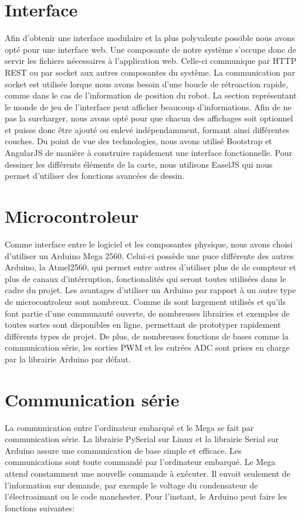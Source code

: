 \section{Interface}
Afin d'obtenir une interface modulaire et la plus polyvalente possible nous avons opté pour une interface web.
Une composante de notre système s'occupe donc de servir les fichiers nécessaires à l'application web.
Celle-ci communique par HTTP REST ou par socket aux autres composantes du système.
La communication par socket est utilisée lorque nous avons besoin d'une boucle de rétroaction rapide,
comme dans le cas de l'information de position du robot.
La section représentant le monde de jeu de l'interface peut afficher beaucoup d'informations.
Afin de ne pas la surcharger, nous avons opté pour que chacun des affichages soit optionnel et puisse donc
être ajouté ou enlevé indépendamment, formant ainsi différentes couches.
Du point de vue des technologies, nous avons utilisé Bootstrap et AngularJS de manière à construire rapidement une interface fonctionnelle.
Pour dessiner les différents éléments de la carte, nous utilisons EaselJS qui nous permet d'utiliser des fonctions avancées de dessin.


\section{Microcontroleur}

Comme interface entre le logiciel et les composantes physique, nous avons choisi d’utiliser un Arduino Mega 2560. Celui-ci possède une puce différente des autres Arduino, la Atmel2560, qui permet entre autres d’utiliser plus de de compteur et plus de canaux d’intérruption, fonctionalités qui seront toutes utilisées dans le cadre du projet. Les avantages d’utiliser un Arduino par rapport à un autre type de microcontroleur sont nombreux. Comme ils sont largement utilisés et qu’ils font partie d’une communauté ouverte, de nombreuses librairies et exemples de toutes sortes sont disponibles en ligne, permettant de prototyper rapidement différents types de projet. De plus, de nombreuses fonctions de bases comme la communication série, les sorties PWM et les entrées ADC sont prises en charge par la librairie Arduino par défaut.

\section{Communication série}

La communication entre l’ordinateur embarqué et le Mega se fait par communication série. La librairie PySerial sur Linux et la librairie Serial sur Arduino assure une communication de base simple et efficace. Les communications sont toute commandé par l’ordinateur embarqué. Le Mega attend constamment une nouvelle commande à exécuter. Il envoit seulement de l’information sur demande, par exemple le voltage du condensateur de l’électroaimant ou le code manchester. Pour l’instant, le Arduino peut faire les fonctions suivantes:

